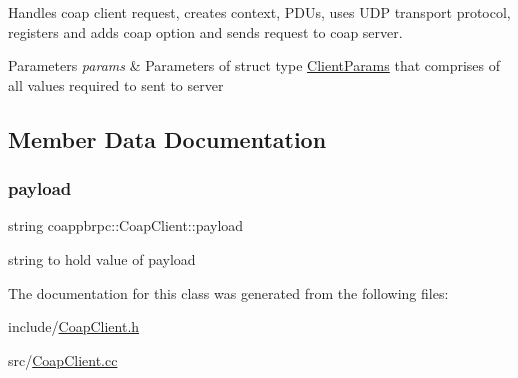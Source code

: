 Handles coap client request, creates context, P\+D\+Us, uses U\+DP transport protocol, registers and adds coap option and sends request to coap server. 


\begin{DoxyParams}{Parameters}
{\em params} & Parameters of struct type \hyperlink{structClientParams}{Client\+Params} that comprises of all values required to sent to server \\
\hline
\end{DoxyParams}


\subsection{Member Data Documentation}
\mbox{\label{classcoappbrpc_1_1CoapClient_ae6909f236ca1cd6b8b6343b7827ea004}} 
\subsubsection{\texorpdfstring{payload}{payload}}
{\footnotesize\ttfamily string coappbrpc\+::\+Coap\+Client\+::payload}

string to hold value of payload 

The documentation for this class was generated from the following files\+:\begin{DoxyCompactItemize}
\item 
include/\hyperlink{CoapClient_8h}{Coap\+Client.\+h}\item 
src/\hyperlink{CoapClient_8cc}{Coap\+Client.\+cc}\end{DoxyCompactItemize}
